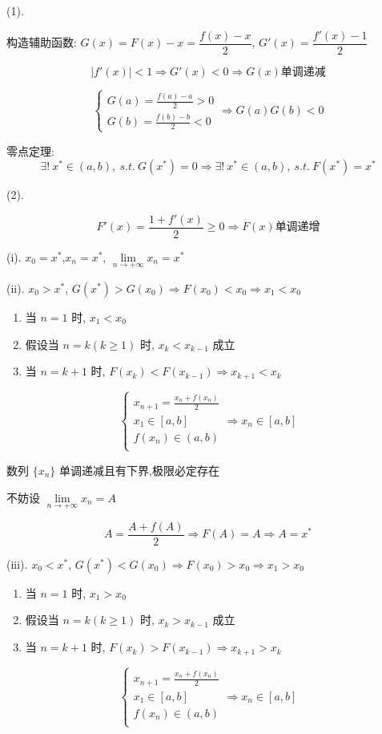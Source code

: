\begin{solution}
	
	(1). 
	
	构造辅助函数: $G(x) = F(x)-x = \dfrac{f(x)-x}{2}$, $G'(x)=\dfrac{f'(x)-1}{2}$
	
	$$|f'(x)|<1\Rightarrow G'(x)<0\Rightarrow G(x)\text{单调递减}$$

	$$\begin{cases}
		G(a) = \frac{f(a)-a}{2}>0\\
		G(b) = \frac{f(b)-b}{2}<0
	\end{cases} \Rightarrow G(a)G(b)<0$$
	
	零点定理: 
	$$\exists!\ x^{*}\in(a,b),\ s.t.\ G(x^{*})=0\Rightarrow \exists!\ x^{*}\in(a,b),\ s.t.\ F(x^{*})=x^{*}$$
	
	(2). 

	$$F'(x)=\dfrac{1+f'(x)}{2}\geq 0\Rightarrow F(x)\text{单调递增}$$
	
	(i). $x_{0}=x^{*}$,$x_{n}=x^{*}$, $\lim\limits_{n\rightarrow +\infty}x_{n}=x^{*}$
	
	(ii). $x_{0}>x^{*}$, $G(x^{*})>G(x_{0})\Rightarrow F(x_{0})<x_{0}\Rightarrow x_{1}<x_{0}$
	\begin{enumerate}
		\item 当 $n=1$ 时, $x_{1}<x_{0}$
		\item 假设当 $n=k(k\geq 1)$ 时, $x_{k}<x_{k-1}$ 成立
		\item 当 $n=k+1$ 时, $F(x_{k})<F(x_{k-1})\Rightarrow x_{k+1}<x_{k}$
	\end{enumerate}
	$$\begin{cases}
		x_{n+1}=\frac{x_{n}+f(x_{n})}{2} \\
		x_{1}\in [a,b] \\
		f(x_{n})\in (a,b)\\
	\end{cases}\Rightarrow x_{n}\in [a,b]$$
	
	数列 $\{x_{n}\}$ 单调递减且有下界,极限必定存在
	
	不妨设 $\lim\limits_{n\to +\infty}x_{n} = A$
	
	$$A=\dfrac{A+f(A)}{2}\Rightarrow F(A)=A\Rightarrow A=x^{*}$$
	
	(iii). $x_{0}<x^{*}$, $G(x^{*})<G(x_{0})\Rightarrow F(x_{0})>x_{0}\Rightarrow x_{1}>x_{0}$
	\begin{enumerate}
		\item 当 $n=1$ 时, $x_{1}>x_{0}$
		\item 假设当 $n=k(k\geq 1)$ 时, $x_{k}>x_{k-1}$ 成立
		\item 当 $n=k+1$ 时, $F(x_{k})>F(x_{k-1})\Rightarrow x_{k+1}>x_{k}$
	\end{enumerate}
	$$\begin{cases}
		x_{n+1}=\frac{x_{n}+f(x_{n})}{2} \\
		x_{1}\in [a,b] \\
		f(x_{n})\in (a,b)\\
	\end{cases}\Rightarrow x_{n}\in [a,b]$$
	

\end{solution}

